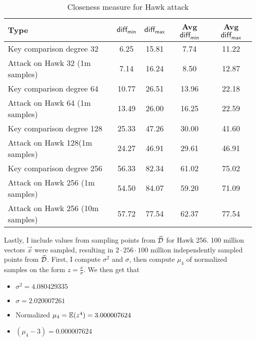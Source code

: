 \begin{table}[H]
    \centering
    \caption{Closeness measure for Hawk attack}
    \begin{tabular}{lcccc}
        \toprule
        \textbf{Type} & $\mathsf{diff_{min}}$ & $\mathsf{diff_{max}}$ & \textbf{Avg $\mathsf{diff_{min}}$} & \textbf{Avg $\mathsf{diff_{max}}$} \\
        \midrule
        Key comparison degree 32 & 6.25 & 15.81 & 7.74 & 11.22 \\
        Attack on Hawk 32 (1m samples) & 7.14 & 16.24 & 8.50 & 12.87 \\
        \midrule
        Key comparison degree 64 & 10.77 & 26.51 & 13.96 & 22.18 \\
        Attack on Hawk 64 (1m samples) & 13.49 & 26.00 & 16.25 & 22.59 \\
        \midrule
        Key comparison degree 128 & 25.33 & 47.26 & 30.00 & 41.60 \\
        Attack on Hawk 128(1m samples) & 24.27 & 46.91 & 29.61 & 46.91 \\
        \midrule

        Key comparison degree 256 & 56.33 & 82.34 & 61.02 & 75.02 \\
        Attack on Hawk 256 (1m samples) & 54.50 & 84.07 & 59.20 & 71.09 \\ 
        Attack on Hawk 256 (10m samples) & 57.72 & 77.54 & 62.37 & 77.54 \\
        \bottomrule
    \end{tabular}
\end{table}
Lastly, I include values from sampling points from $\widehat{\mathcal{D}}$ for Hawk 256. 100 million vectors $\vec{x}$ were sampled, resulting in $2 \cdot 256 \cdot 100$ million independently sampled points from $\widehat{\mathcal{D}}$.
First, I compute $\sigma^2$ and $\sigma$, then compute $\mu_4$ of normalized samples on the form $z = \frac{x}{\sigma}$.
We then get that 
\begin{itemize}
    \item $\sigma^2 = 4.080429335$
    \item $\sigma = 2.020007261$
    \item Normalized $\mu_4 = \mathbb{E} (z^4) = 3.000007624$
    \item $(\mu_4 - 3) = 0.000007624$
\end{itemize}

